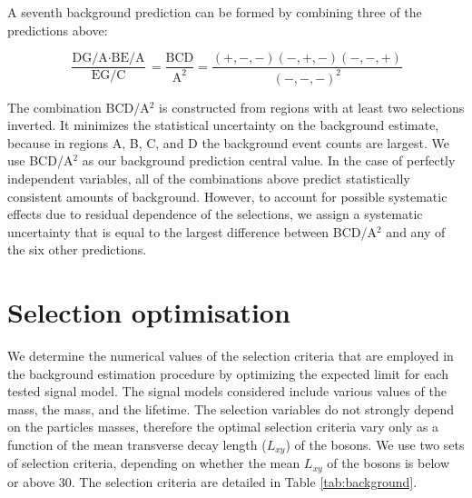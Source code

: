 

A seventh background prediction can be formed by combining three of the predictions above:

\begin{equation}
\frac{\text{DG/A}\cdot\text{BE/A}}{\text{EG/C}} = \frac{\text{BCD}}{\text{A}^2} = \frac{(+,-,-)(-,+,-)(-,-,+)}{(-,-,-)^2}
\end{equation}


The combination BCD/A$^2$ is constructed from regions with at least two selections inverted.
It minimizes the statistical uncertainty on the background estimate, because in regions 
A, B, C, and D
the background event counts are largest. We use BCD/A$^2$ as our background prediction
central value.
In the case of perfectly independent 
variables, all of the combinations above predict statistically consistent  amounts of background. 
However, to account for possible systematic
effects due to residual dependence of the selections, we assign a systematic uncertainty 
that is equal to the largest difference 
between BCD/A$^2$ and any of the six other predictions.

\section{Selection optimisation}
\label{sec:cutvalues}
We determine the numerical values of the selection criteria that are employed in the background estimation procedure 
by optimizing the expected limit for each tested signal model.
The signal models considered include various values of the \Higgs mass, the \X mass, and the \X lifetime.
The selection variables
do not strongly depend on the particles masses, therefore the optimal selection criteria
vary only as a function of the
mean transverse decay length ($L_{xy}$)
of the \X bosons. We use two sets of selection criteria,
depending on whether the mean
$L_{xy}$ of the \X bosons is below or above 30\cm. The selection criteria are
detailed in Table \ref{tab:background}.


